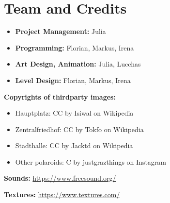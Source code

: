 \documentclass[a4paper]{scrreprt}
\begin{document}


\chapter{Team and Credits}

\begin{itemize}
    \item \textbf{Project Management:} Julia
    \item \textbf{Programming:} Florian, Markus, Irena
    \item \textbf{Art Design, Animation:} Julia, Lucchas
    \item \textbf{Level Design:} Florian, Markus, Irena
    
\end{itemize}

\textbf{Copyrights of thirdparty images:}
\begin{itemize}

\item Hauptplatz: CC by Isiwal on Wikipedia 
\item Zentralfriedhof: CC by Tokfo on Wikipedia 
\item Stadthalle: CC by Jacktd on Wikipedia 
\item Other polaroids: C by justgrazthings on Instagram 

\end{itemize}

\textbf{Sounds: } \url{https://www.freesound.org/} \newline

\textbf{Textures: } \url{https://www.textures.com/} \newline




%
%
\end{document}
